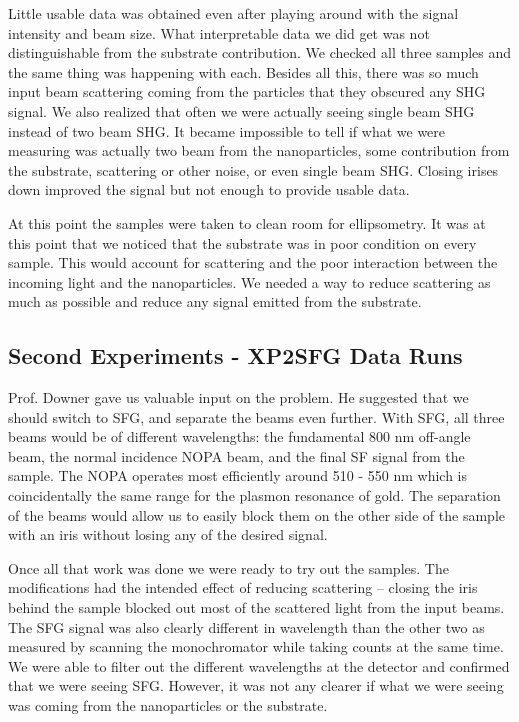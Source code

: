 Little usable data was obtained even after playing around with the signal intensity and beam size. What interpretable data we did get was not distinguishable from the substrate contribution. We checked all three samples and the same thing was happening with each. Besides all this, there was so much input beam scattering coming from the particles that they obscured any SHG signal. We also realized that often we were actually seeing single beam SHG instead of two beam SHG. It became impossible to tell if what we were measuring was actually two beam from the nanoparticles, some contribution from the substrate, scattering or other noise, or even single beam SHG. Closing irises down improved the signal but not enough to provide usable data.

At this point the samples were taken to clean room for ellipsometry. It was at this point that we noticed that the substrate was in poor condition on every sample. This would account for scattering and the poor interaction between the incoming light and the nanoparticles. We needed a way to reduce scattering as much as possible and reduce any signal emitted from the substrate. 

\subsection{Second Experiments - XP2SFG Data Runs}\label{chap_setup_proc_sfg}
Prof. Downer gave us valuable input on the problem. He suggested that we should switch to SFG, and separate the beams even further. With SFG, all three beams would be of different wavelengths: the fundamental 800 nm off-angle beam, the normal incidence NOPA beam, and the final SF signal from the sample. The NOPA operates most efficiently around 510 - 550 nm which is coincidentally the same range for the plasmon resonance of gold. The separation of the beams would allow us to easily block them on the other side of the sample with an iris without losing any of the desired signal. 
 
Once all that work was done we were ready to try out the samples. The modifications had the intended effect of reducing scattering -- closing the iris behind the sample blocked out most of the scattered light from the input beams. The SFG signal was also clearly different in wavelength than the other two as measured by scanning the monochromator while taking counts at the same time. We were able to filter out the different wavelengths at the detector and confirmed that we were seeing SFG. However, it was not any clearer if what we were seeing was coming from the nanoparticles or the substrate.

